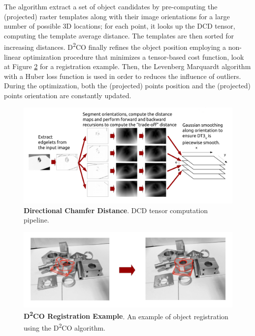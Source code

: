 The algorithm extract a set of object candidates by pre-computing the (projected) raster templates along with their image orientations for a large number of possible 3D locations; for each point, it looks up the DCD tensor, computing the template average distance. The templates are then sorted for increasing distances. D\textsuperscript{2}CO finally refines the object position employing a non-linear optimization procedure that minimizes a tensor-based cost function, look at Figure \ref{fig:d2co_02} for a registration example. Then, the Levenberg Marquardt algorithm with a Huber loss function is used in order to reduces the influence of outliers. During the optimization, both the (projected) points position and the (projected) points orientation are constantly updated.

\begin{figure}
    \centering
    \includegraphics[width=\textwidth]{figures/1_perception_and_sensing_in_robotics/d2co_01}
    \caption{\textbf{Directional Chamfer Distance}. DCD tensor computation pipeline.} 
    \label{fig:d2co_01}
\end{figure}

\begin{figure}
    \centering
    \includegraphics[width=\textwidth]{figures/1_perception_and_sensing_in_robotics/d2co_02}
    \caption{\textbf{D\textsuperscript{2}{CO} Registration Example}. An example of object registration using the D\textsuperscript{2}{CO} algorithm.} 
    \label{fig:d2co_02}
\end{figure}

